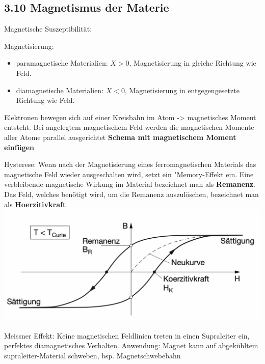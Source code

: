 \subsection*{3.10 Magnetismus der Materie}
    Magnetische Suszeptibilität:

    Magnetisierung:
    \begin{itemize}
        \item paramagnetische Materialien: $X > 0$, Magnetisierung in gleiche Richtung wie Feld. 
        \item diamagnetische Materialien: $X < 0$, Magnetisierung in entgegengesetzte Richtung wie Feld.
    \end{itemize}

    Elektronen bewegen sich auf einer Kreisbahn im Atom -> magnetisches Moment entsteht. Bei angelegtem magnetischem Feld werden die magnetischen Momente aller Atome parallel ausgerichtet
    \textbf{Schema mit magnetischem Moment einfügen}

    Hysterese: Wenn nach der Magnetisierung eines ferromagnetischen Materials das magnetische Feld wieder ausgeschalten wird, setzt ein "Memory-Effekt ein.
    Eine verbleibende magnetische Wirkung im Material bezeichnet man als \textbf{Remanenz}.
    Das Feld, welches benötigt wird, um die Remanenz auszulöschen, bezeichnet man als \textbf{Hoerzitivkraft}
    \includegraphics[width = \linewidth]{src/images/permanentmagnet.png}

    Meissner Effekt: Keine magnetischen Feldlinien treten in einen Supraleiter ein, perfektes diamagnetisches Verhalten.
    Anwendung: Magnet kann auf abgekühltem supraleiter-Material schweben, bsp. Magnetschwebebahn